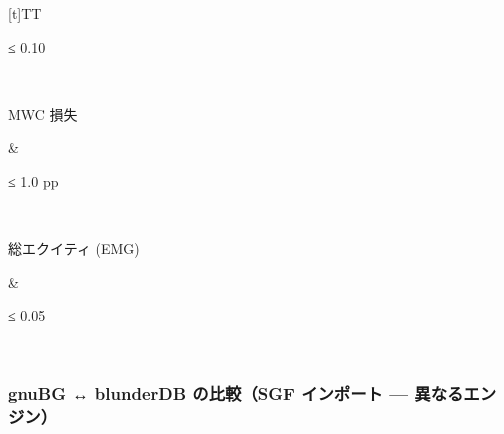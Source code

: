 \documentclass[letterpaper,10pt,dvipdfmx]{sphinxmanual}
\begin{document}
\begin{savenotes}
\begin{tabulary}{\linewidth}[t]{TT}
\begin{varwidth}[t]{}
\sphinxAtStartPar
≤ 0.10
\sphinxbeforeendvarwidth
\end{varwidth}%
\\
\sphinxhline\begin{varwidth}[t]{}
\sphinxAtStartPar
MWC 損失
\sphinxbeforeendvarwidth
\end{varwidth}%
&\begin{varwidth}[t]{}
\sphinxAtStartPar
≤ 1.0 pp
\sphinxbeforeendvarwidth
\end{varwidth}%
\\
\sphinxhline\begin{varwidth}[t]{}
\sphinxAtStartPar
総エクイティ (EMG)
\sphinxbeforeendvarwidth
\end{varwidth}%
&\begin{varwidth}[t]{}
\sphinxAtStartPar
≤ 0.05
\sphinxbeforeendvarwidth
\end{varwidth}%
\\
\sphinxbottomrule
\end{tabulary}
\sphinxtableafterendhook\par
\sphinxattableend\end{savenotes}


\subsubsection{gnuBG ↔ blunderDB の比較（SGF インポート — 異なるエンジン）}
\label{\detokenize{stats_parity:comparaison-gnubg-blunderdb-import-sgf-moteurs-differents}}
\end{document}
